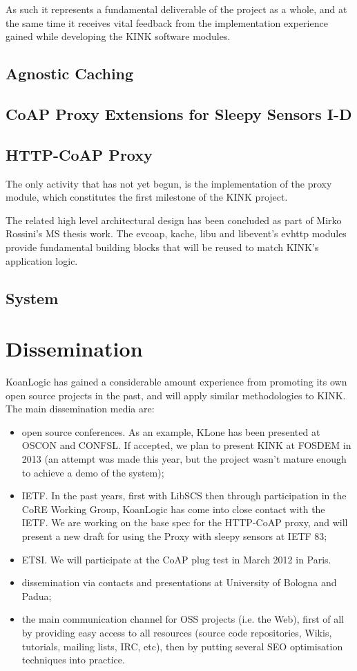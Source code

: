 \documentclass[12pt]{article}
\begin{document}
As such it represents a fundamental deliverable of the project as a whole, and at the same time it receives vital feedback from the implementation experience gained while developing the KINK software modules.

\subsection{Agnostic Caching}


\subsection{CoAP Proxy Extensions for Sleepy Sensors I-D}


\subsection{HTTP-CoAP Proxy}
The only activity that has not yet begun, is the implementation of the proxy module, which constitutes the first milestone of the KINK project. 

The related high level architectural design has been concluded as part of Mirko Rossini's MS thesis work.  The evcoap, kache, libu and libevent's evhttp modules provide fundamental building blocks that will be reused to match KINK's application logic.

\subsection{System}


\section{Dissemination}
KoanLogic has gained a considerable amount experience from promoting its own open source projects in the past, and will apply similar methodologies to KINK. The main dissemination media are:
\begin{itemize}
\item open source conferences. As an example, KLone has been presented at OSCON and CONFSL. If accepted, we plan to present KINK at FOSDEM in 2013 (an attempt was made this year, but the project wasn't mature enough to achieve a demo of the system);
\item IETF. In the past years, first with LibSCS then through participation in the CoRE Working Group, KoanLogic has come into close contact with the IETF.  We are working on the base spec for the HTTP-CoAP proxy, and will present a new draft for using the Proxy with sleepy sensors at IETF 83;
\item ETSI. We will participate at the CoAP plug test in March 2012 in Paris.
\item dissemination via contacts and presentations at University of Bologna and Padua;
\item the main communication channel for OSS projects (i.e. the Web), first of all by providing easy access to all resources (source code repositories, Wikis, tutorials, mailing lists, IRC, etc), then by putting several SEO optimisation techniques into practice.
\end{itemize}
\end{document}
